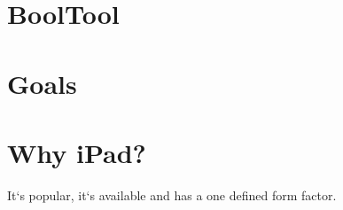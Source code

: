 

\section{BoolTool}
\section{Goals}
\section{Why iPad?}

It‘s popular, it‘s available and has a one defined form factor.
